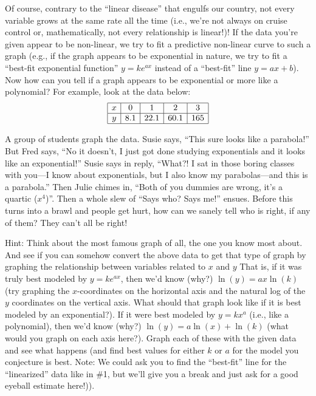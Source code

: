 \begin{prob}
Of course, contrary to the ``linear disease'' that engulfs our
country, not every variable grows at the same rate all the time (i.e.,
we're not always on cruise control or, mathematically, not every
relationship is linear!)!  If the data you're given appear to be
non-linear, we try to fit a predictive non-linear curve to such a
graph (e.g., if the graph appears to be exponential in nature, we try
to fit a ``best-fit exponential function'' $y=ke^{ax}$ instead of a
``best-fit'' line $y=ax+b$).  Now how can you tell if a graph appears
to be exponential or more like a polynomial?  For example, look at the
data below:
\[
\begin{array}{|c|c|c|c|c|}\hline
x & 0 & 1 & 2 & 3 \\ \hline
y & 8.1 & 22.1 & 60.1 & 165 \\ \hline
\end{array}
\]

A group of students graph the data.  Susie says, ``This sure looks
like a parabola!''  But Fred says, ``No it doesn't, I just got done
studying exponentials and it looks like an exponential!''  Susie says
in reply, ``What?! I sat in those boring classes with you---I know
about exponentials, but I also know my parabolas---and this is a
parabola.''  Then Julie chimes in, ``Both of you dummies are wrong,
it's a quartic ($x^4$)''.  Then a whole slew of ``Says who? Says me!''
ensues.  Before this turns into a brawl and people get hurt, how can
we sanely tell who is right, if any of them? They can't all be right!


Hint: Think about the most famous graph of all, the one you know most
about.  And see if you can somehow convert the above data to get that
type of graph by graphing the relationship between variables related
to $x$ and $y$ That is, if it was truly best modeled by $y=ke^{ax}$,
then we'd know (why?) $\ln(y) = ax \ln(k)$ (try graphing the
$x$-coordinates on the horizontal axis and the natural log of the $y$
coordinates on the vertical axis. What should that graph look like if
it is best modeled by an exponential?).  If it were best modeled by $y
= kx^a$ (i.e., like a polynomial), then we'd know (why?) $\ln(y) =
a\ln(x) + \ln(k)$ (what would you graph on each axis here?).  Graph
each of these with the given data and see what happens (and find best
values for either $k$ or $a$ for the model you conjecture is best.  Note:
We could ask you to find the ``best-fit'' line for the ``linearized'' data
like in \#1, but we'll give you a break and just ask for a good eyeball
estimate here!)).


\end{prob}
